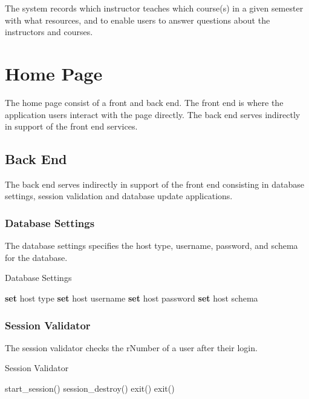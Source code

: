 The system records which instructor teaches which course(s) in a given semester with what resources, and to enable users to answer questions about the instructors and courses.	

  


\section{Home Page}
 The home page consist of a front and back end. The front end is where the application users interact with the page directly. The back end serves indirectly in support of the front end services.
	
	\subsection{Back End}
	The back end serves indirectly in support of the front end consisting in database settings, session validation and database update applications.
	
		\subsubsection{Database Settings}
		The database settings specifies the host type, username, password, and schema for the database.
		\begin{algorithm}[H]
		\caption{Database Settings}
		\begin{algorithmic}[1]
				\State\textbf{set} host type
				\State\textbf{set} host username 
				\State\textbf{set} host password 
				\State\textbf{set} host schema
		\end{algorithmic}		 
		\end{algorithm}
		
		\subsubsection{Session Validator}
		The session validator checks the rNumber of a user after their login. 
		\begin{algorithm}[H]
		\caption{Session Validator}
		\begin{algorithmic}[1]
		\State start\_session()
			\State session\_destroy()
			\State exit()
		\Else
			\State exit()
			\EndIf
		\EndIf
		\end{algorithmic} 
		\end{algorithm}
		

